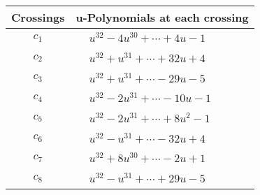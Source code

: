 \documentclass[1p]{elsarticle_modified}
\theoremstyle{definition}
\begin{document}
\begin{tabular}{m{50pt}|m{274pt}}
Crossings & \hspace{64pt}u-Polynomials at each crossing \\
\hline $$\begin{aligned}c_{1}\end{aligned}$$&$\begin{aligned}
&u^{32}-4 u^{30}+\cdots+4 u-1
\end{aligned}$\\
\hline $$\begin{aligned}c_{2}\end{aligned}$$&$\begin{aligned}
&u^{32}+u^{31}+\cdots+32 u+4
\end{aligned}$\\
\hline $$\begin{aligned}c_{3}\end{aligned}$$&$\begin{aligned}
&u^{32}+u^{31}+\cdots-29 u-5
\end{aligned}$\\
\hline $$\begin{aligned}c_{4}\end{aligned}$$&$\begin{aligned}
&u^{32}-2 u^{31}+\cdots-10 u-1
\end{aligned}$\\
\hline $$\begin{aligned}c_{5}\end{aligned}$$&$\begin{aligned}
&u^{32}-2 u^{31}+\cdots+8 u^2-1
\end{aligned}$\\
\hline $$\begin{aligned}c_{6}\end{aligned}$$&$\begin{aligned}
&u^{32}- u^{31}+\cdots-32 u+4
\end{aligned}$\\
\hline $$\begin{aligned}c_{7}\end{aligned}$$&$\begin{aligned}
&u^{32}+8 u^{30}+\cdots-2 u+1
\end{aligned}$\\
\hline $$\begin{aligned}c_{8}\end{aligned}$$&$\begin{aligned}
&u^{32}- u^{31}+\cdots+29 u-5
\end{aligned}$\\

\end{tabular}
\end{document}
